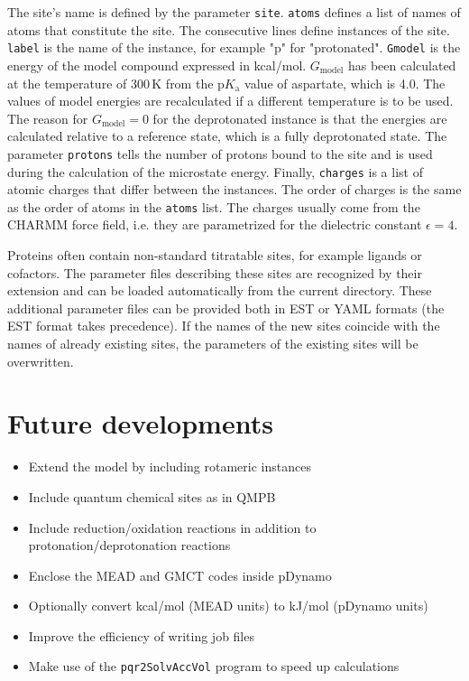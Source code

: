 \documentclass[a4paper,11pt]{article}
\newcommand{\pka}{$\mathrm{p}K_{\mathrm{a}}$\xspace}
\begin{document}
{\bigskip
The site's name is defined by the parameter \texttt{site}. 
%
\texttt{atoms} defines a list of names of atoms that constitute the site.
%
The consecutive lines define instances of the site.
%
\texttt{label} is the name of the instance, for example "p" for "protonated".
%
\texttt{Gmodel} is the energy of the model compound expressed in kcal/mol.
%
$G_{\mathrm{model}}$ has been calculated at the temperature of 300\,K from the 
\pka value of aspartate, which is 4.0.
%
The values of model energies are recalculated if a different temperature is 
to be used.
%
The reason for $G_{\mathrm{model}} = 0$ for the deprotonated instance is that 
the energies are calculated relative to a reference state, which is a fully 
deprotonated state.
%
The parameter \texttt{protons} tells the number of protons bound to the site and 
is used during the calculation of the microstate energy.
%
Finally, \texttt{charges} is a list of atomic charges that differ between 
the instances.
%
The order of charges is the same as the order of atoms in the \texttt{atoms} list.
%
The charges usually come from the CHARMM force field, i.e. they are
parametrized for the dielectric constant $\epsilon = 4$.

Proteins often contain non-standard titratable sites, for example ligands or cofactors.
%
The parameter files describing these sites are recognized by their extension and can be
loaded automatically from the current directory.
%
These additional parameter files can be provided both in EST or YAML formats (the EST format
takes precedence).
%
If the names of the new sites coincide with the names of already existing sites, the
parameters of the existing sites will be overwritten.


\section{Future developments}
\linespread{0.8}

\begin{itemize}
  \setlength{\itemsep}{1.0pt}
  \item Extend the model by including rotameric instances
  \item Include quantum chemical sites as in QMPB
  \item Include reduction/oxidation reactions in addition to protonation/deprotonation reactions
  \item Enclose the MEAD and GMCT codes inside pDynamo
  \item Optionally convert kcal/mol (MEAD units) to kJ/mol (pDynamo units)
  \item Improve the efficiency of writing job files
  \item Make use of the \texttt{pqr2SolvAccVol} program to speed up calculations 
\end{itemize}

}
\end{document}
